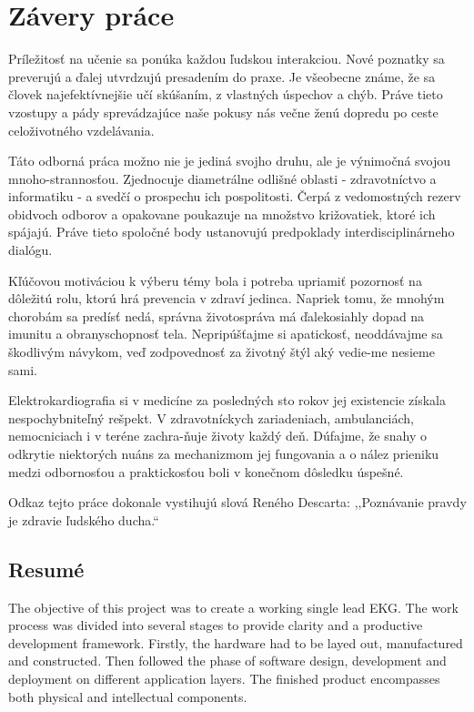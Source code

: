 \documentclass[titlepage,12pt]{article}
\begin{document}
\newpage
\section{Závery práce}
Príležitosť na učenie sa ponúka každou ľudskou interakciou. Nové poznatky sa preverujú a ďalej utvrdzujú presadením do praxe. Je všeobecne známe, že sa človek najefektívnejšie učí skúšaním, z vlastných úspechov a chýb. Práve tieto vzostupy a pády sprevádzajúce naše pokusy nás večne ženú dopredu po ceste celoživotného vzdelávania.

Táto odborná práca možno nie je jediná svojho druhu, ale je výnimočná svojou mnoho-strannosťou. Zjednocuje diametrálne odlišné oblasti - zdravotníctvo a informatiku - a svedčí o prospechu ich pospolitosti. Čerpá z vedomostných rezerv obidvoch odborov a opakovane poukazuje na množstvo križovatiek, ktoré ich spájajú. Práve tieto spoločné body ustanovujú predpoklady interdisciplinárneho dialógu.

Kľúčovou motiváciou k výberu témy bola i potreba upriamiť pozornosť na dôležitú rolu, ktorú hrá prevencia v zdraví jedinca. Napriek tomu, že mnohým chorobám sa predísť nedá, správna životospráva má ďalekosiahly dopad na imunitu a obranyschopnosť tela. Nepripúšťajme \linebreak si apatickosť, neoddávajme sa škodlivým návykom, veď zodpovednosť za životný štýl aký vedie-me nesieme sami.

Elektrokardiografia si v medicíne za posledných sto rokov jej existencie získala nespochybniteľný rešpekt. V zdravotníckych zariadeniach, ambulanciách, nemocniciach i v teréne zachra-ňuje životy každý deň. Dúfajme, že snahy o odkrytie niektorých nuáns za mechanizmom jej fungovania a o nález prieniku medzi odbornosťou a praktickosťou boli v konečnom dôsledku úspešné. 

Odkaz tejto práce dokonale vystihujú slová Reného Descarta: ,,Poznávanie pravdy je zdravie ľudského ducha.“

\subsection*{Resumé}
The objective of this project was to create a working single lead EKG. The work process was divided into several stages to provide clarity and a productive development framework. Firstly, the hardware had to be layed out, manufactured and constructed. Then followed the phase of software design, development and deployment on different application layers. The finished product encompasses both physical and intellectual components.
\end{document}
